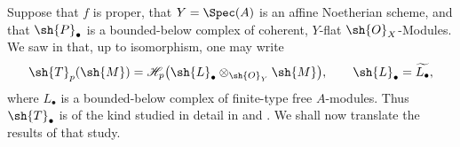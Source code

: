 \begin{env}[7.7.4]
\label{III.7.7.4}
Suppose that $f$ is proper, that $Y=\Spec(A)$ is an affine
Noetherian scheme, and that $\sh{P}_\bullet$ is a
bounded-below complex of coherent, $Y$-flat
$\sh{O}_X$-Modules.  We saw in  that, up to
isomorphism, one may write
\[
  \sh{T}_p(\sh{M})
  =
  \mathscr{H}_p
    \bigl(\sh{L}_\bullet
      \otimes_{\sh{O}_Y}\sh{M}\bigr),
  \qquad
  \sh{L}_\bullet=\widetilde{L_\bullet},
\]
where $L_\bullet$ is a bounded-below complex of
finite-type free $A$-modules.  Thus
$\sh{T}_\bullet$ is of the kind studied in detail in
 and .  We shall now translate
the results of that study.
\end{env}

\egaIIISubsectionSevenSevenTheorems

